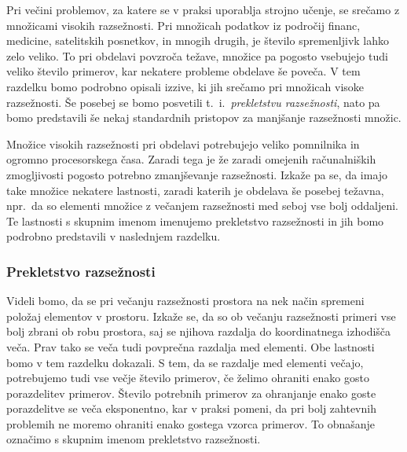 \documentclass[12pt,a4paper]{article}
\begin{document}
Pri večini problemov, za katere se v praksi uporablja strojno učenje, se srečamo z množicami visokih razsežnosti. 
Pri množicah podatkov iz področij financ, medicine, satelitskih posnetkov, in mnogih drugih, je število spremenljivk lahko zelo veliko. 
To pri obdelavi povzroča težave, množice pa pogosto vsebujejo tudi veliko število primerov, kar nekatere probleme obdelave še poveča. %
V tem razdelku bomo podrobno opisali izzive, ki jih srečamo pri množicah visoke razsežnosti. 
Še posebej se bomo posvetili t.~i.~\emph{prekletstvu razsežnosti}, nato pa bomo predstavili še nekaj standardnih pristopov za manjšanje razsežnosti množic.

Množice visokih razsežnosti pri obdelavi potrebujejo veliko pomnilnika in ogromno procesorskega časa. 
Zaradi tega je že zaradi omejenih računalniških zmogljivosti pogosto potrebno zmanjševanje razsežnosti. 
Izkaže pa se, da imajo take množice nekatere lastnosti, zaradi katerih je obdelava še posebej težavna, 
npr.\ da so elementi množice z večanjem razsežnosti med seboj vse bolj oddaljeni. 
Te lastnosti s skupnim imenom imenujemo prekletstvo razsežnosti in jih bomo podrobno predstavili v naslednjem razdelku.



\subsubsection{Prekletstvo razsežnosti}

Videli bomo, da se pri večanju razsežnosti prostora na nek način spremeni položaj elementov v prostoru. 
Izkaže se, da so ob večanju razsežnosti primeri vse bolj zbrani ob robu prostora, saj se njihova razdalja do koordinatnega izhodišča veča. 
Prav tako se veča tudi povprečna razdalja med elementi. Obe lastnosti bomo v tem razdelku dokazali. 
S tem, da se razdalje med elementi večajo, potrebujemo tudi vse večje število primerov, če želimo ohraniti enako gosto porazdelitev primerov. 
Število potrebnih primerov za ohranjanje enako goste porazdelitve se veča eksponentno, kar v praksi pomeni, da pri bolj zahtevnih problemih ne moremo ohraniti enako gostega vzorca primerov. 
To obnašanje označimo s skupnim imenom prekletstvo razsežnosti.
\end{document}
